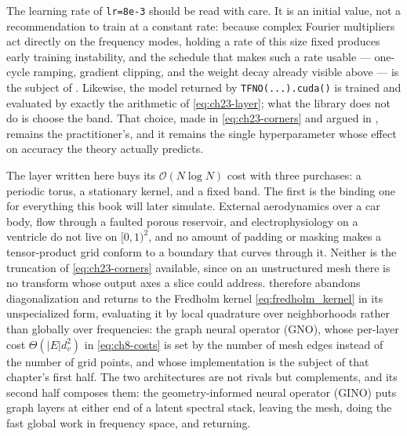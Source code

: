 The learning rate of \texttt{lr=8e-3} should be read with care. It is an initial
value, not a recommendation to train at a constant rate: because complex
Fourier multipliers act directly on the frequency modes, holding a rate of this
size fixed produces early training instability, and the schedule that makes such
a rate usable --- one-cycle ramping, gradient clipping, and the weight decay
already visible above --- is the subject of
. Likewise, the
model returned by \texttt{TFNO(...).cuda()} is trained and evaluated by exactly
the arithmetic of \eqref{eq:ch23-layer}; what the library does not do is choose
the band. That choice, made in \eqref{eq:ch23-corners} and argued in
, remains the
practitioner's, and it remains the single hyperparameter whose effect on accuracy
the theory actually predicts.

\medskip
The layer written here buys its $\mathcal{O}(N \log N)$ cost with three
purchases: a periodic torus, a stationary kernel, and a fixed band. The first is
the binding one for everything this book will later simulate. External
aerodynamics over a car body, flow through a faulted porous reservoir, and
electrophysiology on a ventricle do not live on $[0,1)^2$, and no amount of
padding or masking makes a tensor-product grid conform to a boundary that curves
through it. 
Neither is the truncation of \eqref{eq:ch23-corners} available, since on an
unstructured mesh there is no transform whose output axes a slice could address.
therefore abandons diagonalization and returns to the Fredholm kernel
\eqref{eq:fredholm_kernel} in its unspecialized form, evaluating it by local
quadrature over neighborhoods rather than globally over frequencies: the graph
neural operator (GNO), whose per-layer cost $\Theta(|E| d_v^2)$ in
\eqref{eq:ch8-costs} is set by the number of mesh edges instead of the number of
grid points, and whose implementation is the subject of that chapter's first
half. The two architectures are not rivals but complements, and its second half
composes them: the geometry-informed neural operator (GINO) puts graph layers at
either end of a latent spectral stack, leaving the mesh, doing the fast global
work in frequency space, and returning.
